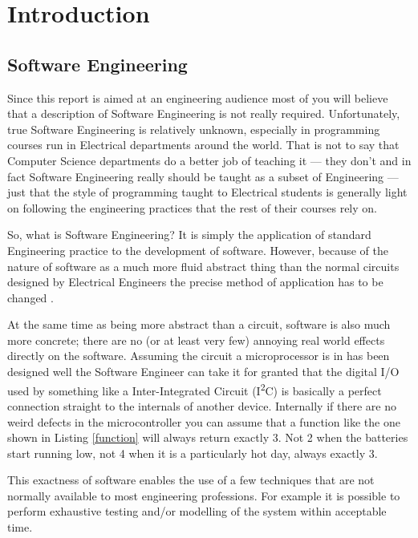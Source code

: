 \section{Introduction}

  \subsection{Software Engineering}

    Since this report is aimed at an engineering audience most of you will
    believe that a description of Software Engineering is not really required.
    Unfortunately, true Software Engineering is relatively unknown, especially in
    programming courses run in Electrical departments around the world.  That is
    not to say that Computer Science departments do a better job of teaching it
    --- they don't \cite{Shepard:2001:MTT:376134.376180} and in fact Software
    Engineering really should be taught as a subset of Engineering
    \cite{Parnas_1999} --- just that the style of programming taught to
    Electrical students is generally light on following the engineering
    practices that the rest of their courses rely on.

    So, what is Software Engineering?  It is simply the application of standard
    Engineering practice to the development of software.  However, because of the
    nature of software as a much more fluid abstract thing than the normal
    circuits designed by Electrical Engineers the precise method of application
    has to be changed \cite{vanVliet:2000:SEP:352372}.

    At the same time as being more abstract than a circuit, software is also
    much more concrete; there are no (or at least very few) annoying real world
    effects directly on the software.  Assuming the circuit a microprocessor is
    in has been designed well the Software Engineer can take it for granted that
    the digital I/O used by something like a Inter-Integrated Circuit
    (I\textsuperscript{2}C) is basically a perfect connection straight to the
    internals of another device.  Internally if there are no weird defects in
    the microcontroller you can assume that a function like the one shown in
    Listing \ref{function} will always return exactly 3.  Not 2 when the
    batteries start running low, not 4 when it is a particularly hot day, always
    exactly 3.

    This exactness of software enables the use of a few techniques that are not
    normally available to most engineering professions.  For example it is
    possible to perform exhaustive testing and/or modelling of the system within
    acceptable time.

